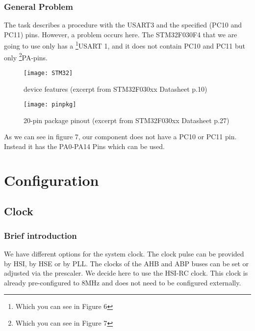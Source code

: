 \documentclass[11pt]{scrartcl}
\begin{document}
	\subsubsection{General Problem}
The task describes a procedure with the USART3 and the specified (PC10 and PC11) pins. However, a problem occurs here. The STM32F030F4 that we are going to use only has a \footnote{\label{foot:11}Which you can see in Figure 6}USART 1, and it does not contain PC10 and PC11 but only \footnote{\label{foot:12}Which you can see in Figure 7}PA-pins. 
\begin{figure}[h]
		\centering
		\texttt{[image: STM32]}
		\caption{device features (excerpt from STM32F030xx Datasheet p.10)}
\end{figure}	
\begin{figure}[h]
		\centering
		\texttt{[image: pinpkg]}
		\caption{20-pin package pinout (excerpt from STM32F030xx Datasheet p.27)}
\end{figure}	
\newpage
As we can see in figure 7, our component does not have a PC10 or PC11 pin. Instead it has the PA0-PA14 Pins which can be used.



\newpage
	\section{Configuration}
	\subsection{Clock}
	\subsubsection{Brief introduction}
We have different options for the system clock. The clock pulse can be provided by HSI, by HSE or by PLL. The clocks of the AHB and ABP buses can be set or adjusted via the prescaler. We decide here to use the HSI-RC clock. This clock is already pre-configured to 8MHz and does not need to be configured externally.
\end{document}
